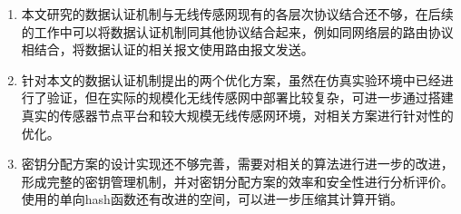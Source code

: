 \begin{enumerate}\setlength{\itemsep}{-\itemsep}
  \item 本文研究的数据认证机制与无线传感网现有的各层次协议结合还不够，在后续的工作中可以将数据认证机制同其他协议结合起来，例如同网络层的路由协议相结合，将数据认证的相关报文使用路由报文发送。
  \item 针对本文的数据认证机制提出的两个优化方案，虽然在仿真实验环境中已经进行了验证，但在实际的规模化无线传感网中部署比较复杂，可进一步通过搭建真实的传感器节点平台和较大规模无线传感网环境，对相关方案进行针对性的优化。
  \item 密钥分配方案的设计实现还不够完善，需要对相关的算法进行进一步的改进，形成完整的密钥管理机制，并对密钥分配方案的效率和安全性进行分析评价。使用的单向hash函数还有改进的空间，可以进一步压缩其计算开销。
\end{enumerate}





